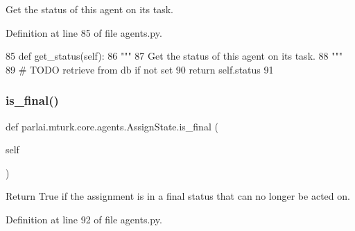 \begin{DoxyVerb}Get the status of this agent on its task.
\end{DoxyVerb}
 

Definition at line 85 of file agents.\+py.


\begin{DoxyCode}
85     \textcolor{keyword}{def }get\_status(self):
86         \textcolor{stringliteral}{"""}
87 \textcolor{stringliteral}{        Get the status of this agent on its task.}
88 \textcolor{stringliteral}{        """}
89         \textcolor{comment}{# TODO retrieve from db if not set}
90         \textcolor{keywordflow}{return} self.status
91 
\end{DoxyCode}
\mbox{\label{classparlai_1_1mturk_1_1core_1_1agents_1_1AssignState_a95b2a76b6e8ec7e045542450ee49f971}} 
\subsubsection{\texorpdfstring{is\+\_\+final()}{is\_final()}}
{\footnotesize\ttfamily def parlai.\+mturk.\+core.\+agents.\+Assign\+State.\+is\+\_\+final (\begin{DoxyParamCaption}\item[{}]{self }\end{DoxyParamCaption})}

\begin{DoxyVerb}Return True if the assignment is in a final status that can no longer be acted
on.
\end{DoxyVerb}
 

Definition at line 92 of file agents.\+py.


